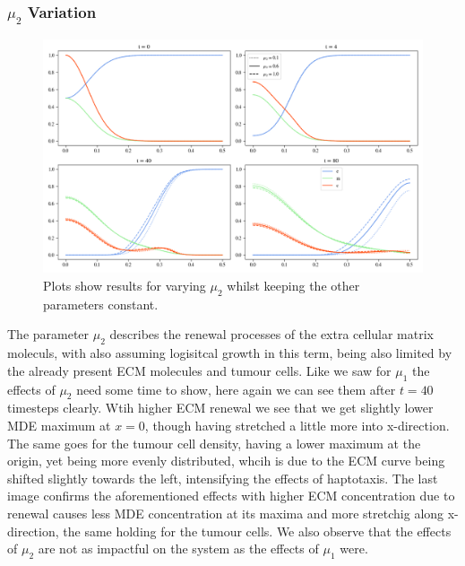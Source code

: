 \subsubsection*{$\mu_2$ Variation}
\begin{figure}[h]
    \centering
    \includegraphics[width=\textwidth]{resources/images/prolif_mu_2_variation.png}
    \caption{Plots show results for varying $\mu_2$ whilst keeping the other parameters constant.}
    \label{fig:prolif_mu_2_variation}
\end{figure}

The parameter $\mu_2$ describes the renewal processes of the extra cellular matrix moleculs, with also assuming logisitcal growth in this term, being also limited by the already present ECM molecules and tumour cells.
Like we saw for $\mu_1$ the effects of $\mu_2$ need some time to show, here again we can see them after $t=40$ timesteps clearly. Wtih higher ECM renewal we see that we get slightly lower MDE maximum at $x=0$, though having stretched a little more into x-direction. The same goes for the tumour cell density, having a lower maximum at the origin, yet being more evenly distributed, whcih is due to the ECM curve being shifted slightly towards the left, intensifying the effects of haptotaxis. The last image confirms the aforementioned effects with higher ECM concentration due to renewal causes less MDE concentration at its maxima and more stretchig along x-direction, the same holding for the tumour cells. We also observe that the effects of $\mu_2$ are not as impactful on the system as the effects of $\mu_1$ were.


